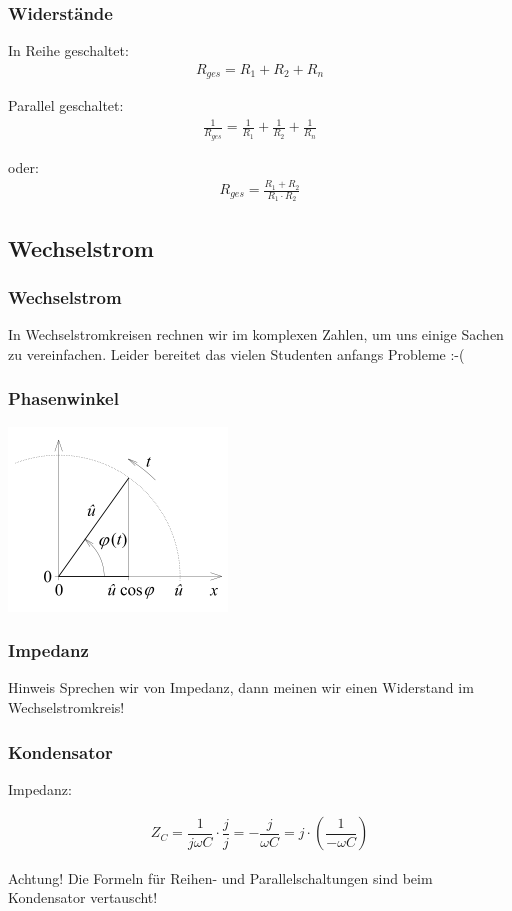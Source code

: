 \documentclass[german,ignorenonframetext]{beamer} %
\begin{document}
\begin{frame}
\frametitle{Widerstände}
In Reihe geschaltet:
\begin{eqnarray}
R_{ges} = R_{1} + R_{2} + R_{n}
\end{eqnarray}

Parallel geschaltet:
\begin{eqnarray}
\frac{1}{R_{ges}} = \frac{1}{R_{1}} + \frac{1}{R_{2}} + \frac{1}{R_{n}}
\end{eqnarray}

oder:
\begin{eqnarray}
R_{ges} = \frac{R_{1} + R_{2}}{R_{1} \cdot R_{2}}
\end{eqnarray}

\end{frame}

\subsection{Wechselstrom}
\begin{frame}
\frametitle{Wechselstrom}
In Wechselstromkreisen rechnen wir im komplexen Zahlen, um uns einige Sachen zu vereinfachen. Leider bereitet das vielen Studenten
anfangs Probleme :-(
\end{frame}

\begin{frame}
\frametitle{Phasenwinkel}
\begin{center}
\includegraphics[scale=0.5]{../phase.png} 
\end{center}
\end{frame}

\begin{frame}
\frametitle{Impedanz}
\begin{block}{Hinweis}
Sprechen wir von Impedanz, dann meinen wir einen Widerstand im Wechselstromkreis!
\end{block}
\end{frame}

\begin{frame}
\frametitle{Kondensator}
Impedanz:
\begin{center}
\begin{eqnarray}
Z_{C} = \dfrac{1}{j \omega C} \cdot \dfrac{j}{j} = - \dfrac{j}{\omega C} = j \cdot (\dfrac{1}{- \omega C})
\end{eqnarray}
\end{center}
\begin{alertblock}{Achtung!}
Die Formeln für Reihen- und Parallelschaltungen sind beim Kondensator vertauscht!
\end{alertblock}
\end{frame}
\end{document}
